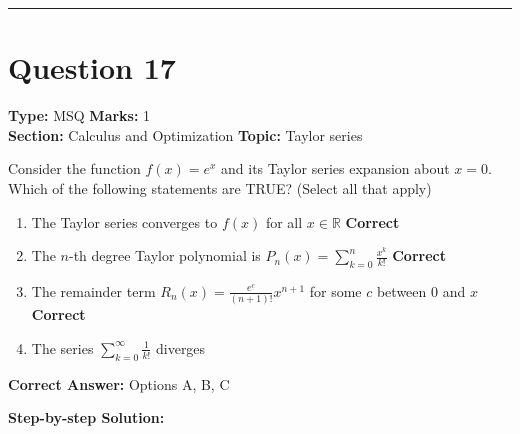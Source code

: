 \documentclass[11pt]{article}
\begin{document}
\vspace{0.8em}
\hrule
\vspace{0.4em}
\section*{Question 17}
\textbf{Type:} MSQ \hfill \textbf{Marks:} 1\\
\textbf{Section:} Calculus and Optimization \hfill \textbf{Topic:} Taylor series

Consider the function \(f(x) = e^x\) and its Taylor series expansion about \(x = 0\). Which of the following statements are TRUE? (Select all that apply)


\begin{enumerate}[label=\textbf{\Alph*.}, leftmargin=1.8em]
\item The Taylor series converges to \(f(x)\) for all \(x \in \mathbb{R}\) \hfill {\color{gategreen}\textbf{Correct}}\item The \(n\)-th degree Taylor polynomial is \(P_n(x) = \sum_{k=0}^{n} \frac{x^k}{k!}\) \hfill {\color{gategreen}\textbf{Correct}}\item The remainder term \(R_n(x) = \frac{e^c}{(n+1)!} x^{n+1}\) for some \(c\) between \(0\) and \(x\) \hfill {\color{gategreen}\textbf{Correct}}\item The series \(\sum_{k=0}^{\infty} \frac{1}{k!}\) diverges\end{enumerate}

\textbf{Correct Answer:} Options A, B, C

\textbf{Step-by-step Solution:}
\end{document}
